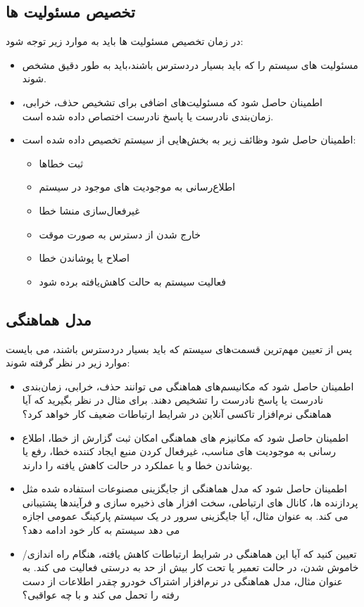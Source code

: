 \subsection{تخصیص مسئولیت ها} 
در زمان تخصیص مسئولیت ها باید  به موارد زیر توجه شود:
\begin{itemize}
\item
مسئولیت های سیستم را که باید بسیار در‌دسترس باشند،باید به طور دقیق مشخص شوند.
\item
اطمینان حاصل شود که مسئولیت‌های اضافی برای تشخیص حذف، خرابی، زمان‌بندی نادرست یا پاسخ نادرست اختصاص داده شده است.
\item
اطمینان حاصل شود وظائف زیر به بخش‌هایی از سیستم تخصیص داده شده است:
\begin{itemize}
\item
ثبت خطا‌ها
\item
اطلاع‌رسانی به موجودیت های موجود در سیستم
\item
غیر‌فعال‌سازی منشا خطا
\item
خارج شدن از دسترس به صورت موقت
\item
اصلاح یا پوشاندن خطا
\item
فعالیت سیستم به حالت کاهش‌یافته  برده شود
\end{itemize}
\end{itemize}

\subsection{مدل هماهنگی}
پس از تعیین مهم‌ترین قسمت‌های سیستم که باید بسیار در‌دسترس باشند، می بایست موارد زیر در نظر گرفته شوند:
\begin{itemize}
\item
اطمینان حاصل شود که مکانیسم‌های هماهنگی می توانند حذف، خرابی، زمان‌بندی نادرست یا پاسخ نادرست را تشخیص دهند. برای مثال در نظر بگیرید که آیا هماهنگی نرم‌افزار تاکسی آنلاین در شرایط ارتباطات ضعیف کار خواهد کرد؟
\item
اطمینان حاصل شود که مکانیزم های هماهنگی امکان ثبت گزارش از خطا، اطلاع رسانی به موجودیت های مناسب، غیرفعال کردن منبع ایجاد کننده خطا، رفع یا پوشاندن خطا و یا عملکرد در حالت کاهش یافته را دارند.
\item
اطمینان حاصل شود که مدل هماهنگی از جایگزینی مصنوعات استفاده شده مثل پردازنده ها، کانال های ارتباطی، سخت افزار های ذخیره سازی و فرآیندها پشتیبانی می کند. به عنوان مثال، آیا جایگزینی سرور در یک سیستم پارکینگ عمومی اجازه می دهد سیستم به کار خود ادامه دهد؟
\item
تعیین کنید که آیا این هماهنگی در شرایط ارتباطات کاهش یافته، هنگام راه اندازی/ خاموش شدن، در حالت تعمیر یا تحت کار بیش از حد به درستی فعالیت می کند. به عنوان مثال، مدل هماهنگی در نرم‌افزار اشتراک خودرو چقدر اطلاعات از دست رفته را تحمل می کند و با چه عواقبی؟
\end{itemize}

